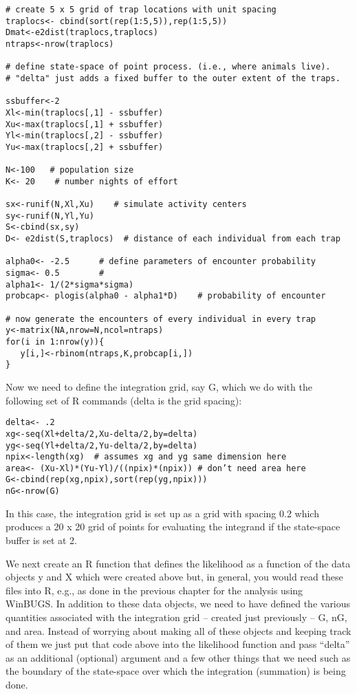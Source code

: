 \begin{verbatim}
# create 5 x 5 grid of trap locations with unit spacing
traplocs<- cbind(sort(rep(1:5,5)),rep(1:5,5))
Dmat<-e2dist(traplocs,traplocs)
ntraps<-nrow(traplocs)

# define state-space of point process. (i.e., where animals live).
# "delta" just adds a fixed buffer to the outer extent of the traps. 

ssbuffer<-2
Xl<-min(traplocs[,1] - ssbuffer)
Xu<-max(traplocs[,1] + ssbuffer)
Yl<-min(traplocs[,2] - ssbuffer)
Yu<-max(traplocs[,2] + ssbuffer)

N<-100   # population size
K<- 20    # number nights of effort

sx<-runif(N,Xl,Xu)    # simulate activity centers
sy<-runif(N,Yl,Yu)
S<-cbind(sx,sy) 
D<- e2dist(S,traplocs)  # distance of each individual from each trap

alpha0<- -2.5      # define parameters of encounter probability
sigma<- 0.5        #
alpha1<- 1/(2*sigma*sigma)
probcap<- plogis(alpha0 - alpha1*D)    # probability of encounter

# now generate the encounters of every individual in every trap
y<-matrix(NA,nrow=N,ncol=ntraps)
for(i in 1:nrow(y)){
   y[i,]<-rbinom(ntraps,K,probcap[i,])
}
\end{verbatim}

Now we need to define the integration grid, say G, which we do with
the following set of R commands (delta is the grid spacing):

\begin{verbatim}
delta<- .2
xg<-seq(Xl+delta/2,Xu-delta/2,by=delta) 
yg<-seq(Yl+delta/2,Yu-delta/2,by=delta) 
npix<-length(xg)  # assumes xg and yg same dimension here
area<- (Xu-Xl)*(Yu-Yl)/((npix)*(npix)) # don’t need area here
G<-cbind(rep(xg,npix),sort(rep(yg,npix)))
nG<-nrow(G)
\end{verbatim}

In this case, the integration grid is set up as a grid with spacing
0.2 which produces a 20 x 20 grid of points for evaluating the
integrand if the state-space buffer is set at 2.

We next create an R function that defines the likelihood as a function
of the data objects y and X which were created above but, in general,
you would read these files into R, e.g., as done in the previous
chapter for the analysis using WinBUGS.  In addition to these data
objects, we need to have defined the various quantities associated
with the integration grid – created just previously -- G, nG, and
area.  Instead of worrying about making all of these objects and
keeping track of them we just put that code above into the likelihood
function and pass “delta” as an additional (optional) argument and a
few other things that we need such as the boundary of the state-space
over which the integration (summation) is being done.


